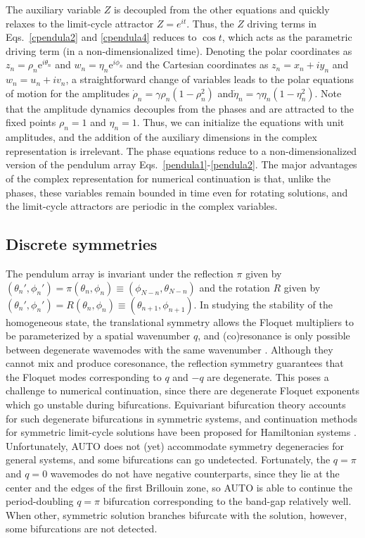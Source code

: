 \documentclass[aps,pre,amsmath,amssymb,floatfix,onecolumn,notitlepage,10pt]{revtex4-1}
\begin{document}
The auxiliary variable $Z$ is decoupled from the other equations and quickly relaxes to the limit-cycle attractor $Z=e^{it}$. Thus, the $Z$ driving terms in Eqs.~\eqref{cpendula2} and \eqref{cpendula4} reduces to $\cos t$, which acts as the parametric driving term (in a non-dimensionalized time). Denoting the polar coordinates as $z_n = \rho_n{\mathrm e}^{i\theta_n}$ and $w_n = \eta_n{\mathrm e}^{i\phi_n}$ and the Cartesian coordinates as $z_n = x_n + iy_n$ and $w_n = u_n+iv_n$, a straightforward change of variables leads to the polar equations of motion for the amplitudes $\dot \rho_n = \gamma \rho_n \left(1-\rho_n^2\right)$ and$\dot \eta_n =  \gamma \eta_n \left(1-\eta_n^2\right)$. Note that the amplitude dynamics decouples from the phases and are attracted to the fixed points $\rho_n=1$ and $\eta_n=1$.  Thus, we can initialize the equations with unit amplitudes, and the addition of the auxiliary dimensions in the complex representation is irrelevant.  The phase equations reduce to a non-dimensionalized version of the pendulum array Eqs.~\eqref{pendula1}-\eqref{pendula2}. The major advantages of the complex representation for numerical continuation is that, unlike the phases, these variables remain bounded in time even for rotating solutions, and the limit-cycle attractors are periodic in the complex variables.  

\subsection{Discrete symmetries}
The pendulum array is invariant under the reflection $\pi$ given by $(\theta_n',\phi_n') = \pi(\theta_n,\phi_n) \equiv (\phi_{N-n},\theta_{N-n})$ and the rotation $R$ given by $(\theta_n',\phi_n')=R(\theta_n,\phi_n)\equiv(\theta_{n+1},\phi_{n+1})$. In studying the stability of the homogeneous state, the translational symmetry allows the Floquet multipliers to be parameterized by a spatial wavenumber $q$, and (co)resonance is only possible between degenerate wavemodes with the same wavenumber \cite{2021_Nicolaou_2}. Although they cannot mix and produce coresonance, the reflection symmetry guarantees that the Floquet modes corresponding to $q$ and $-q$ are degenerate. This poses a challenge to numerical continuation, since there are degenerate Floquet exponents which go unstable during bifurcations. Equivariant bifurcation theory accounts for such degenerate bifurcations in symmetric systems, and continuation methods for symmetric limit-cycle solutions have been proposed for Hamiltonian systems \cite{2006_Wulff}. Unfortunately, AUTO does not (yet) accommodate symmetry degeneracies for general systems, and some bifurcations can go undetected.  Fortunately, the $q=\pi$ and $q=0$ wavemodes do not have negative counterparts, since they lie at the center and the edges of the first Brillouin zone, so AUTO is able to continue the period-doubling $q=\pi$ bifurcation corresponding to the band-gap relatively well. When other, symmetric solution branches bifurcate with the solution, however, some bifurcations are not detected.
\end{document}
